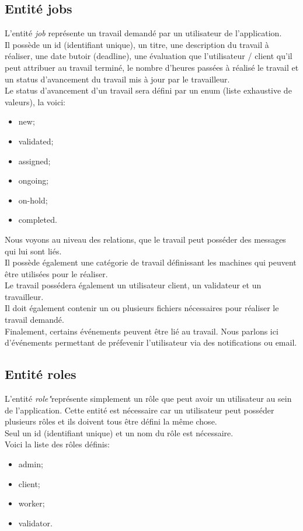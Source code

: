\documentclass[
    iai, %
    il, %
]{heig-tb}
\begin{document}
\subsection{Entité jobs}
L'entité \emph{job} représente un travail demandé par un utilisateur de l'application.\\
Il possède un id (identifiant unique), un titre, une description du travail à réaliser, une date butoir (deadline), une évaluation que l'utilisateur / client qu'il peut attribuer au travail terminé, le nombre d'heures passées à réalisé le travail et un status d'avancement du travail mis à jour par le travailleur.\\
Le status d'avancement d'un travail sera défini par un enum (liste exhaustive de valeurs), la voici:
\begin{itemize}
    \item new;
    \item validated;
    \item assigned;
    \item ongoing;
    \item on-hold;
    \item completed.
\end{itemize}

Nous voyons au niveau des relations, que le travail peut posséder des messages qui lui sont liés.\\
Il possède également une catégorie de travail définissant les machines qui peuvent être utilisées pour le réaliser.\\
Le travail possédera également un utilisateur client, un validateur et un travailleur.\\
Il doit également contenir un ou plusieurs fichiers nécessaires pour réaliser le travail demandé.\\
Finalement, certains événements peuvent être lié au travail. Nous parlons ici d'événements permettant de préfevenir l'utilisateur via des notifications ou email.

\subsection{Entité roles}
L'entité \emph{role"}représente simplement un rôle que peut avoir un utilisateur au sein de l'application. Cette entité est nécessaire car un utilisateur peut posséder plusieurs rôles et ils doivent tous être défini la même chose.\\
Seul un id (identifiant unique) et un nom du rôle est nécessaire.\\
Voici la liste des rôles définis:
\begin{itemize}
    \item admin;
    \item client;
    \item worker;
    \item validator.
\end{itemize}
\end{document}

